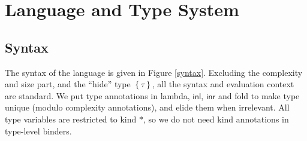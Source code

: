 \documentclass[preprint]{sigplanconf}
\newcommand{\thide}[1]{\left \{ #1 \right \}}
\newcommand{\syminl}{\mathsf{inl}}
\newcommand{\syminr}{\mathsf{inr}}
\begin{document}
\section{\label{section-lang}Language and Type System}

\subsection{Syntax}

The syntax of the language is given in Figure \ref{syntax}. Excluding the complexity and size part, and the ``hide'' type $\thide{\tau}$, all the syntax and evaluation context are standard. We put type annotations in lambda, $\syminl$, $\syminr$ and fold to make type unique (modulo complexity annotations), and elide them when irrelevant. All type variables are restricted to kind $*$, so we do not need kind annotations in type-level binders.
\end{document}
